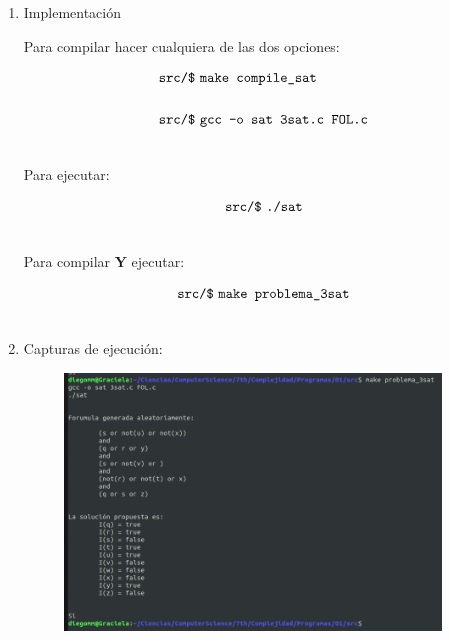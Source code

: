 \documentclass[14pt,letterpaper]{article}
\begin{document}
\begin{itemize}
\begin{enumerate}
  \item Implementación

    Para compilar hacer cualquiera de las dos opciones:

    \begin{align*}
      \text{{\tt src/\$}}\ & \text{{\tt make compile\_sat}}\\\\
      \text{{\tt src/\$}}\ & \text{{\tt gcc -o sat 3sat.c FOL.c}}\\\\      
    \end{align*}

    Para ejecutar:
    
    \begin{align*}
      \text{{\tt src/\$}}\ & \text{{\tt ./sat}}\\\\
    \end{align*}

    Para compilar {\bf Y} ejecutar:
    
    \begin{align*}
      \text{{\tt src/\$}}\ & \text{{\tt make problema\_3sat}}\\\\
    \end{align*}

  \item Capturas de ejecución:

    \begin{figure}[h]
      \includegraphics[width=10cm]{sat_1.png}
      \centering
    \end{figure}

    \hfill\break
    

\end{enumerate}
\end{itemize}
\end{document}
